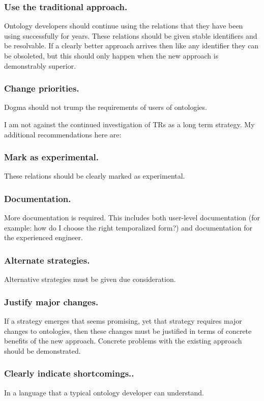 \documentclass{bioinfo}
\begin{document}
\subsubsection{Use the traditional approach.} Ontology developers should
continue using the relations that they have been using successfully
for years. These relations should be given stable identifiers and be
resolvable. If a clearly better approach arrives then like any
identifier they can be obsoleted, but this should only happen when the
new approach is demonstrably superior.

\subsubsection{Change priorities.} Dogma should not trump the
requirements of users of ontologies.

I am not against the continued investigation of TRs as a long term
strategy. My additional recommendations here are:

\subsubsection{Mark as experimental.} These relations should be clearly
marked as experimental.

\subsubsection{Documentation.} More documentation is required. This
includes both user-level documentation (for example: how do I choose
the right temporalized form?) and documentation for the experienced
engineer.

\subsubsection{Alternate strategies.} Alternative strategies must be
given due consideration.

\subsubsection{Justify major changes.} If a strategy emerges that
seems promising, yet that strategy requires major changes to
ontologies, then these changes must be justified in terms of concrete
benefits of the new approach. Concrete problems with the existing
approach should be demonstrated.

\subsubsection{Clearly indicate shortcomings..} In a language that a
typical ontology developer can understand.
\end{document}
